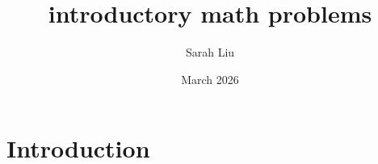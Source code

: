 \documentclass{article}
\title{introductory math problems}
\author{Sarah Liu}
\date{March 2026}
\begin{document}
\maketitle

\section{Introduction}
\end{document}
